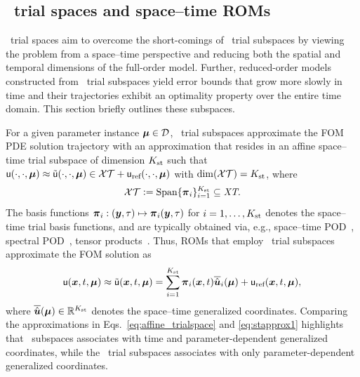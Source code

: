 \documentclass[3p,computermodern,10pt]{elsarticle}
\begin{document}
\subsection{\spaceTimeAcronym\ trial spaces and space--time ROMs}
\spaceTimeAcronym\ trial
spaces aim to overcome the short-comings of \spatialAcronym\ trial subspaces by viewing the problem from a space--time perspective and reducing both the spatial and temporal dimensions of the full-order
model. Further, reduced-order models constructed from \spaceTimeAcronym\ trial subspaces yield error bounds that grow more slowly in time and
their trajectories exhibit an optimality property over the entire time domain. This section briefly outlines these subspaces.

For a given parameter instance $\boldsymbol \mu \in \mathcal{D}$, \spaceTimeAcronym\ trial subspaces approximate the FOM PDE solution
trajectory with an approximation that resides in an
	affine space--time trial subspace of dimension $K_{\text{st}}$ such that $\mathsf{u}(\cdot,\cdot,\boldsymbol \mu) \approx 
	\tilde{\mathsf{u}}(\cdot,\cdot,\boldsymbol \mu) \in \mathcal{XT} + \mathsf{u}_{\text{ref}}(\cdot,\cdot,\boldsymbol \mu)$ with $\dim(\mathcal{XT}) =K_{\text{st}} $, where
\begin{equation}\label{eq:sttrialspace_def}
 \mathcal{XT} \vcentcolon= 
	\text{Span}\{\boldsymbol \pi_i\}_{i=1}^{K_{\text{st}}} 
	\subseteq \textit{XT}.
\end{equation}
The basis functions $\boldsymbol \pi_i: (\boldsymbol y,\tau) \mapsto \boldsymbol \pi_i(\boldsymbol y,\tau)$ for $i=1,\ldots,K_{\text{st}}$ denotes the space--time trial basis functions, and are typically obtained via, e.g., space--time POD~\cite{}, spectral POD~\cite{}, tensor products~\cite{choi_stlspg}. Thus, ROMs that employ
\spaceTimeAcronym\ trial subspaces approximate the FOM solution as
\begin{equation}\label{eq:stapprox1}
 \mathsf{u}(\boldsymbol x, t,\boldsymbol \mu) \approx \tilde{\mathsf{u}}(\boldsymbol x, t,\boldsymbol \mu) = \sum_{i=1}^{K_{\text{st}}} \boldsymbol \pi_i(\boldsymbol x,t) \overline{\hat{\boldsymbol u}}_i(\boldsymbol \mu) + \mathsf{u}_{\text{ref}}(\boldsymbol x, t,\boldsymbol \mu),
\end{equation}
where $ \overline{\hat{\boldsymbol u}}(\boldsymbol \mu) \in \mathbb{R}^{K_{\text{st}}}$ denotes the space--time generalized coordinates. Comparing the approximations in Eqs.~\eqref{eq:affine_trialspace} and \eqref{eq:stapprox1} 
highlights that \spatialAcronym\ subspaces associates with time and parameter-dependent
generalized coordinates, while the \spaceTimeAcronym\ trial subspaces associates with only parameter-dependent generalized coordinates. 
\end{document}
